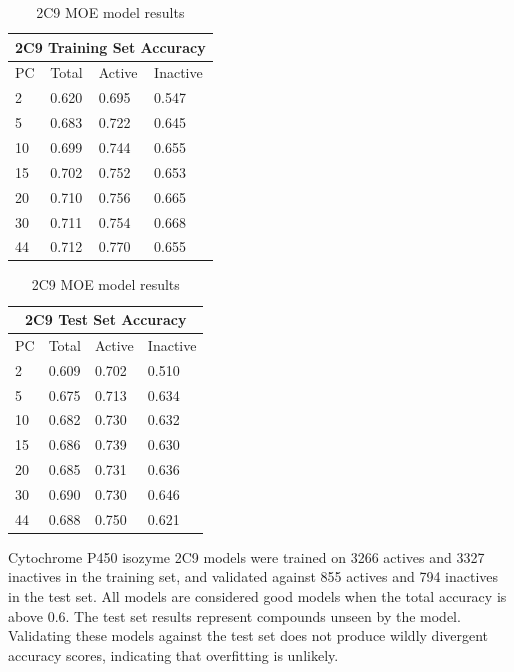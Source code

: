 \begin{table}[!htbp]
\begin{minipage}{.5\linewidth}
\centering
\begin{tabular}{|l|l|l|l|}
\hline
\multicolumn{4}{|c|}{2C9 Training Set Accuracy} \\ \hline
PC & Total          & Active          & Inactive\\ \hline
2  & 0.620          & 0.695           & 0.547   \\ \hline
5  & 0.683          & 0.722           & 0.645   \\ \hline
10 & 0.699          & 0.744           & 0.655   \\ \hline
15 & 0.702          & 0.752           & 0.653   \\ \hline
20 & 0.710          & 0.756           & 0.665   \\ \hline
30 & 0.711          & 0.754           & 0.668   \\ \hline
44 & 0.712          & 0.770           & 0.655   \\ \hline
\end{tabular}
\end{minipage}
\begin{minipage}{.5\linewidth}
\centering
\begin{tabular}{|l|l|l|l|}
\hline
\multicolumn{4}{|c|}{2C9 Test Set Accuracy}     \\ \hline
PC & Total          & Active          & Inactive\\ \hline
2  & 0.609          & 0.702           & 0.510   \\ \hline
5  & 0.675          & 0.713           & 0.634   \\ \hline
10 & 0.682          & 0.730           & 0.632   \\ \hline
15 & 0.686          & 0.739           & 0.630   \\ \hline
20 & 0.685          & 0.731           & 0.636   \\ \hline
30 & 0.690          & 0.730           & 0.646   \\ \hline
44 & 0.688          & 0.750           & 0.621   \\ \hline
\end{tabular}
\end{minipage}
\caption{2C9 MOE model results}
\end{table}

Cytochrome P450 isozyme 2C9 models were trained on 3266 actives and 3327 inactives in the training set, and validated against 855 actives and 794 inactives in the test set. All models are considered good models when the total accuracy is above 0.6. The test set results represent compounds unseen by the model. Validating these models against the test set does not produce wildly divergent accuracy scores, indicating that overfitting is unlikely.


